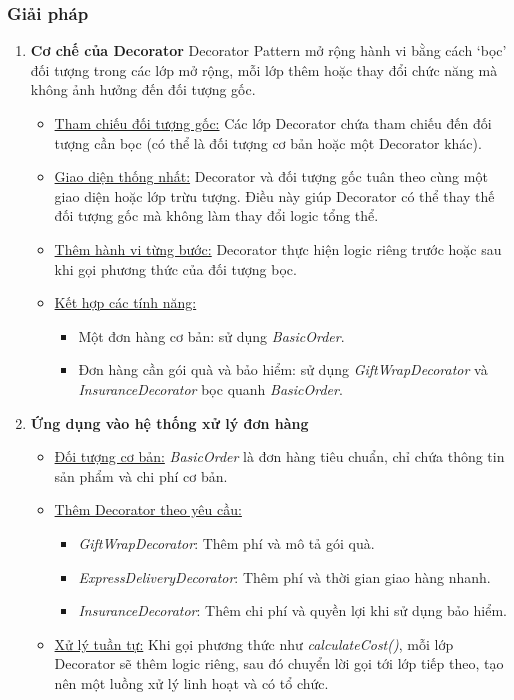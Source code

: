 \subsubsection{Giải pháp}
\begin{enumerate}
    \item \textbf{Cơ chế của Decorator}\newline
          Decorator Pattern mở rộng hành vi bằng cách `bọc' đối tượng trong các lớp mở rộng, mỗi lớp thêm hoặc thay đổi chức năng mà không ảnh hưởng đến đối tượng gốc.
          \begin{itemize}
              \item \underline{Tham chiếu đối tượng gốc:} Các lớp Decorator chứa tham chiếu đến đối tượng cần bọc (có thể là đối tượng cơ bản hoặc một Decorator khác).
              \item \underline{Giao diện thống nhất:} Decorator và đối tượng gốc tuân theo cùng một giao diện hoặc lớp trừu tượng. Điều này giúp Decorator có thể thay thế đối tượng gốc mà không làm thay đổi logic tổng thể.
              \item \underline{Thêm hành vi từng bước:} Decorator thực hiện logic riêng trước hoặc sau khi gọi phương thức của đối tượng bọc.
              \item \underline{Kết hợp các tính năng:}
                    \begin{itemize}
                        \item Một đơn hàng cơ bản: sử dụng \textit{BasicOrder}.
                        \item Đơn hàng cần gói quà và bảo hiểm: sử dụng \textit{GiftWrapDecorator} và \textit{InsuranceDecorator} bọc quanh \textit{BasicOrder}.
                    \end{itemize}
          \end{itemize}

    \item \textbf{Ứng dụng vào hệ thống xử lý đơn hàng}
          \begin{itemize}
              \item \underline{Đối tượng cơ bản:} \textit{BasicOrder} là đơn hàng tiêu chuẩn, chỉ chứa thông tin sản phẩm và chi phí cơ bản.
              \item \underline{Thêm Decorator theo yêu cầu:}
                    \begin{itemize}
                        \item \textit{GiftWrapDecorator}: Thêm phí và mô tả gói quà.
                        \item \textit{ExpressDeliveryDecorator}: Thêm phí và thời gian giao hàng nhanh.
                        \item \textit{InsuranceDecorator}: Thêm chi phí và quyền lợi khi sử dụng bảo hiểm.
                    \end{itemize}
              \item \underline{Xử lý tuần tự:} Khi gọi phương thức như \textit{calculateCost()}, mỗi lớp Decorator sẽ thêm logic riêng, sau đó chuyển lời gọi tới lớp tiếp theo, tạo nên một luồng xử lý linh hoạt và có tổ chức.
          \end{itemize}
\end{enumerate}

